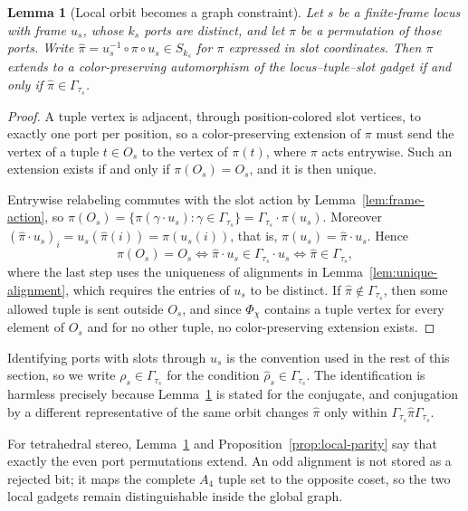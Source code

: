 \documentclass[pdflatex,sn-mathphys-num,referee,lineno]{sn-jnl}
\theoremstyle{plain}
\newtheorem{lemma}[theorem]{Lemma}
\theoremstyle{remark}
\theoremstyle{definition}
\begin{document}
\begin{lemma}[Local orbit becomes a graph constraint]
\label{lem:gadget-stabilizer}
Let \(s\) be a finite-frame locus with frame \(u_s\), whose \(k_s\) ports are
distinct, and let \(\pi\) be a permutation of those ports.  Write
\(\hat\pi=u_s^{-1}\circ\pi\circ u_s\in S_{k_s}\) for \(\pi\) expressed in slot
coordinates.  Then \(\pi\) extends to a color-preserving automorphism of the
locus--tuple--slot gadget if and only if \(\hat\pi\in\Gamma_{\tau_s}\).
\end{lemma}

\begin{proof}
A tuple vertex is adjacent, through position-colored slot vertices, to exactly
one port per position, so a color-preserving extension of \(\pi\) must send the
vertex of a tuple \(t\in O_s\) to the vertex of \(\pi(t)\), where \(\pi\) acts
entrywise.  Such an extension exists if and only if
\(\pi(O_s)=O_s\), and it is then unique.

Entrywise relabeling commutes with the slot action by
Lemma~\ref{lem:frame-action}, so
\(\pi(O_s)=\{\pi(\gamma\cdot u_s):\gamma\in\Gamma_{\tau_s}\}
=\Gamma_{\tau_s}\cdot\pi(u_s)\).  Moreover
\(\left(\hat\pi\cdot u_s\right)_i=u_s\!\left(\hat\pi(i)\right)
=\pi\!\left(u_s(i)\right)\), that is, \(\pi(u_s)=\hat\pi\cdot u_s\).  Hence
\[
  \pi(O_s)=O_s
  \iff
  \hat\pi\cdot u_s\in\Gamma_{\tau_s}\cdot u_s
  \iff
  \hat\pi\in\Gamma_{\tau_s},
\]
where the last step uses the uniqueness of alignments in
Lemma~\ref{lem:unique-alignment}, which requires the entries of \(u_s\) to be
distinct.  If \(\hat\pi\notin\Gamma_{\tau_s}\), then some allowed tuple is sent
outside \(O_s\), and since \(\Phi_\chi\) contains a tuple vertex for every
element of \(O_s\) and for no other tuple, no color-preserving extension
exists.
\end{proof}

Identifying ports with slots through \(u_s\) is the convention used in the rest
of this section, so we write \(\rho_s\in\Gamma_{\tau_s}\) for the condition
\(\hat\rho_s\in\Gamma_{\tau_s}\).  The identification is harmless precisely
because Lemma~\ref{lem:gadget-stabilizer} is stated for the conjugate, and
conjugation by a different representative of the same orbit changes
\(\hat\pi\) only within \(\Gamma_{\tau_s}\hat\pi\Gamma_{\tau_s}\).

For tetrahedral stereo, Lemma~\ref{lem:gadget-stabilizer} and
Proposition~\ref{prop:local-parity} say that exactly the even port
permutations extend.  An odd alignment is not stored as a rejected bit; it
maps the complete \(A_4\) tuple set to the opposite coset, so the two local
gadgets remain distinguishable inside the global graph.
\end{document}
